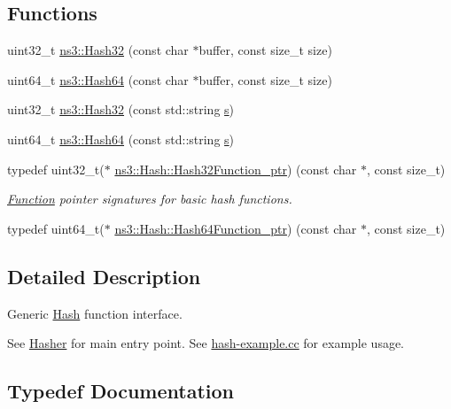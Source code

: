 \subsection*{Functions}
\begin{DoxyCompactItemize}
\item 
uint32\+\_\+t \hyperlink{group__hash_ga7245e12aa78a81c7d008dd8fba67aeb4}{ns3\+::\+Hash32} (const char $\ast$buffer, const size\+\_\+t size)
\item 
uint64\+\_\+t \hyperlink{group__hash_ga32813ece904f0d68bba1999f8752143a}{ns3\+::\+Hash64} (const char $\ast$buffer, const size\+\_\+t size)
\item 
uint32\+\_\+t \hyperlink{group__hash_ga98dd2a34bea4a1ac7a931e2cdba9abd7}{ns3\+::\+Hash32} (const std\+::string \hyperlink{generate__test__data__lte__sinr_8m_ad83eeb3a142285d1243a08c6b7026df8}{s})
\item 
uint64\+\_\+t \hyperlink{group__hash_ga55a9bd814aa55b8bd15f44ff030e72d9}{ns3\+::\+Hash64} (const std\+::string \hyperlink{generate__test__data__lte__sinr_8m_ad83eeb3a142285d1243a08c6b7026df8}{s})
\end{DoxyCompactItemize}
\begin{DoxyCompactItemize}
\item 
typedef uint32\+\_\+t($\ast$ \hyperlink{group__hash_gaf05ee221eddbade063bfefbf34ed485a}{ns3\+::\+Hash\+::\+Hash32\+Function\+\_\+ptr}) (const char $\ast$, const size\+\_\+t)
\begin{DoxyCompactList}\small\item\em \hyperlink{namespacens3_1_1Hash_1_1Function}{Function} pointer signatures for basic hash functions. \end{DoxyCompactList}\item 
typedef uint64\+\_\+t($\ast$ \hyperlink{group__hash_gab363931a84d780a98d09dd85db36a666}{ns3\+::\+Hash\+::\+Hash64\+Function\+\_\+ptr}) (const char $\ast$, const size\+\_\+t)
\end{DoxyCompactItemize}


\subsection{Detailed Description}
Generic \hyperlink{namespacens3_1_1Hash}{Hash} function interface. 

See \hyperlink{classns3_1_1Hasher}{Hasher} for main entry point. See \hyperlink{hash-example_8cc}{hash-\/example.\+cc} for example usage. 

\subsection{Typedef Documentation}
